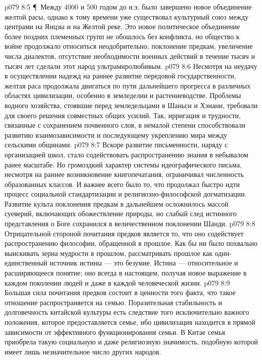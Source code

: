 \vs p079 8:5 \P\ Между 4000 и 500 годом до н.э. было завершено новое объединение желтой расы, однако к тому времени уже существовал культурный союз между центрами на Янцзы и на Желтой реке. Это новое политическое объединение более поздних племенных групп не обошлось без конфликта, но общество к войне продолжало относиться неодобрительно; поклонение предкам, увеличение числа диалектов, отсутствие необходимости военных действий в течение тысяч и тысяч лет сделали этот народ ультрамиролюбивым.
\vs p079 8:6 Несмотря на неудачу в осуществлении надежд на раннее развитие передовой государственности, желтая раса продолжала двигаться по пути дальнейшего прогресса в различных областях цивилизации, особенно в земледелии и растениеводстве. Проблемы водного хозяйства, стоявшие перед земледельцами в Шаньси и Хэнани, требовали для своего решения совместных общих усилий. Так, ирригация и трудности, связанные с сохранением почвенного слоя, в немалой степени способствовали развитию взаимозависимости и последующему укреплению мира между сельскими общинами.
\vs p079 8:7 Вскоре развитие письменности, наряду с организацией школ, стало содействовать распространению знания в небывалом ранее масштабе. Но громоздкий характер системы идеографического письма, несмотря на раннее возникновение книгопечатания, ограничивал численность образованных классов. И важнее всего было то, что продолжал быстро идти процесс социальной стандартизации и религиозно\hyp{}философской догматизации. Развитие культа поклонения предкам в дальнейшем осложнилось массой суеверий, включающих обожествление природы, но слабый след истинного представления о Боге сохранился в величественном поклонении Шанди.
\vs p079 8:8 Отрицательной стороной почитания предков является то, что оно содействует распространению философии, обращенной в прошлое. Как бы ни было похвально выискивать зерна мудрости в прошлом, рассматривать прошлое как один\hyp{}единственный источник истины --- это безумие. Истина --- относительное и расширяющееся понятие; оно  всегда в настоящем, получая новое выражение в каждом поколении людей и даже в каждой человеческой жизни.
\vs p079 8:9 Большая сила почитания предков состоит в ценности того факта, что такое отношение распространяется на семью. Поразительная стабильность и долговечность китайской культуры есть следствие того исключительно важного положения, которое предоставляется семье, ибо цивилизация находится в прямой зависимости от эффективного функционирования семьи. В Китае семья приобрела такую социальную и даже религиозную значимость, подобную которой имеет лишь незначительное число других народов.
